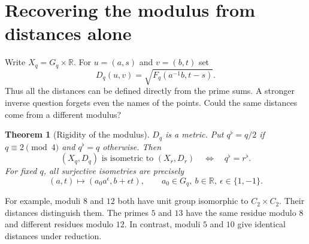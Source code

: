 \documentclass[11pt]{article}
\newtheorem{theorem}{Theorem}
\newcommand{\R}{\mathbb R}
\begin{document}
\section{Recovering the modulus from distances alone}
Write $X_q=G_q\times\R$. For $u=(a,s)$ and $v=(b,t)$ set
\[
 D_q(u,v)=\sqrt{F_q(a^{-1}b,t-s)} .
\]
Thus all the distances can be defined directly from the prime sums. A stronger inverse question forgets even the names of the points. Could the same distances come from a different modulus?

\begin{theorem}[Rigidity of the modulus]\label{th:rigid}
$D_q$ is a metric. Put $q^\flat=q/2$ if $q\equiv2\pmod4$ and $q^\flat=q$ otherwise. Then
\[
 (X_q,D_q)\text{ is isometric to }(X_r,D_r)
 \quad\Longleftrightarrow\quad q^\flat=r^\flat.
\]
For fixed $q$, all surjective isometries are precisely
\[
 (a,t)\longmapsto(a_0a^\epsilon,b+\epsilon t),
 \qquad a_0\in G_q,\ b\in\R,\ \epsilon\in\{1,-1\}.
\]
\end{theorem}
For example, moduli $8$ and $12$ both have unit group isomorphic to $C_2\times C_2$. Their distances distinguish them. The primes $5$ and $13$ have the same residue modulo $8$ and different residues modulo $12$. In contrast, moduli $5$ and $10$ give identical distances under reduction.
\end{document}
